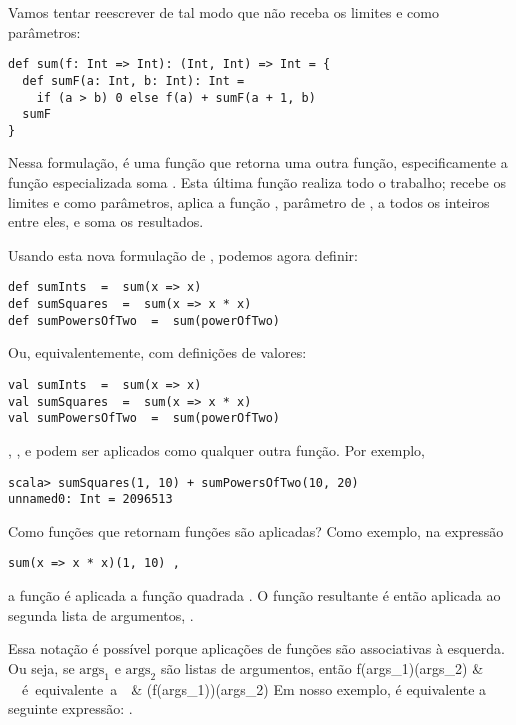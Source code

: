 Vamos tentar reescrever  de tal modo que n\~{a}o receba os limites
 e  como par\^{a}metros:     

\begin{lstlisting}
def sum(f: Int => Int): (Int, Int) => Int = {
  def sumF(a: Int, b: Int): Int =
    if (a > b) 0 else f(a) + sumF(a + 1, b)
  sumF
}
\end{lstlisting}

Nessa formula\c{c}\~{a}o,  \'{e} uma fun\c{c}\~{a}o que retorna uma outra fun\c{c}\~{a}o, especificamente
a fun\c{c}\~{a}o especializada soma . Esta \'{u}ltima fun\c{c}\~{a}o realiza todo o trabalho; 
recebe os limites  e  como par\^{a}metros, aplica a fun\c{c}\~{a}o , par\^{a}metro
de , a todos os inteiros entre eles, e soma os resultados.
      
Usando esta nova formula\c{c}\~{a}o de , podemos agora definir:
\begin{lstlisting}
def sumInts  =  sum(x => x)
def sumSquares  =  sum(x => x * x)
def sumPowersOfTwo  =  sum(powerOfTwo)
\end{lstlisting}
Ou, equivalentemente, com defini\c{c}\~{o}es de valores:
\begin{lstlisting}
val sumInts  =  sum(x => x)
val sumSquares  =  sum(x => x * x)
val sumPowersOfTwo  =  sum(powerOfTwo)
\end{lstlisting}

, , e  podem ser
aplicados como qualquer outra fun\c{c}\~{a}o. Por exemplo,
\begin{lstlisting}
scala> sumSquares(1, 10) + sumPowersOfTwo(10, 20)
unnamed0: Int = 2096513
\end{lstlisting}

Como fun\c{c}\~{o}es que retornam fun\c{c}\~{o}es s\~{a}o aplicadas? Como exemplo, na express\~{a}o 
\begin{lstlisting}
sum(x => x * x)(1, 10) ,
\end{lstlisting}
a fun\c{c}\~{a}o  \'{e} aplicada a fun\c{c}\~{a}o quadrada . 
O fun\c{c}\~{a}o resultante \'{e} ent\~{a}o aplicada ao segunda lista de argumentos, .   

Essa nota\c{c}\~{a}o \'{e} poss\'{i}vel porque aplica\c{c}\~{o}es de fun\c{c}\~{o}es s\~{a}o associativas à esquerda.
Ou seja, se $\mbox{args}_1$ e $\mbox{args}_2$ s\~{a}o listas de argumentos, ent\~{a}o 
f(\mbox{args}_1)(\mbox{args}_2) & \ \ \mbox{\'{e} equivalente a}\ \ & (f(\mbox{args}_1))(\mbox{args}_2)
\eda
Em nosso exemplo,  \'{e} equivalente a seguinte express\~{a}o:
.

